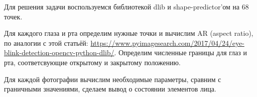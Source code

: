 \solutionSection

Для решения задачи воспользуемся библиотекой dlib и shape-predictor'ом на 68 точек.

Для каждого глаза и рта определим нужные точки и вычислим AR (aspect ratio), по аналогии с этой статьёй: \url{https://www.pyimagesearch.com/2017/04/24/eye-blink-detection-opencv-python-dlib/}. Определим численные границы для глаз и рта, соответсвующие открытому и закрытому положению.

Для каждой фотографии вычислим необходимые параметры, сравним с граничными значениями, сделаем вывод о состоянии элементов лица.

\codeExample

